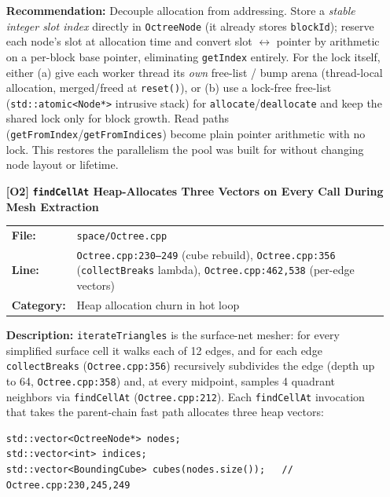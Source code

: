 \documentclass[a4paper,12pt]{article}
\newcommand{\severitybox}[2]{%
  \colorbox{#1}{\makebox[2.5cm][c]{\textcolor{white}{\textbf{#2}}}}%
}
\begin{document}
\begin{enumerate}[leftmargin=*]
  \textbf{Recommendation:}
  Decouple allocation from addressing. Store a \emph{stable integer slot index}
  directly in \texttt{OctreeNode} (it already stores \texttt{blockId}); reserve
  each node's slot at allocation time and convert slot $\leftrightarrow$ pointer by
  arithmetic on a per-block base pointer, eliminating \texttt{getIndex} entirely.
  For the lock itself, either (a) give each worker thread its \emph{own} free-list
  / bump arena (thread-local allocation, merged/freed at \texttt{reset()}), or
  (b) use a lock-free free-list (\texttt{std::atomic<Node*>} intrusive stack) for
  \texttt{allocate}/\texttt{deallocate} and keep the shared lock only for block
  growth. Read paths (\texttt{getFromIndex}/\texttt{getFromIndices}) become plain
  pointer arithmetic with no lock. This restores the parallelism the pool was
  built for without changing node layout or lifetime.

\item[\textbf{[O2]}] \textbf{\texttt{findCellAt} Heap-Allocates Three Vectors on Every Call During Mesh Extraction}
  \hfill \severitybox{highcolor}{HIGH}

  \begin{tabular}{ll}
    \textbf{File:} & \texttt{space/Octree.cpp} \\
    \textbf{Line:} & \texttt{Octree.cpp:230--249} (cube rebuild),
                      \texttt{Octree.cpp:356} (\texttt{collectBreaks} lambda),
                      \texttt{Octree.cpp:462,538} (per-edge vectors) \\
    \textbf{Category:} & Heap allocation churn in hot loop \\
  \end{tabular}

  \textbf{Description:}
  \texttt{iterateTriangles} is the surface-net mesher: for every simplified
  surface cell it walks each of 12 edges, and for each edge \texttt{collectBreaks}
  (\texttt{Octree.cpp:356}) recursively subdivides the edge (depth up to 64,
  \texttt{Octree.cpp:358}) and, at every midpoint, samples 4 quadrant neighbors via
  \texttt{findCellAt} (\texttt{Octree.cpp:212}). Each \texttt{findCellAt}
  invocation that takes the parent-chain fast path allocates three heap vectors:

  \begin{lstlisting}
std::vector<OctreeNode*> nodes;
std::vector<int> indices;
std::vector<BoundingCube> cubes(nodes.size());   // Octree.cpp:230,245,249
  \end{lstlisting}


\end{enumerate}
\end{document}
